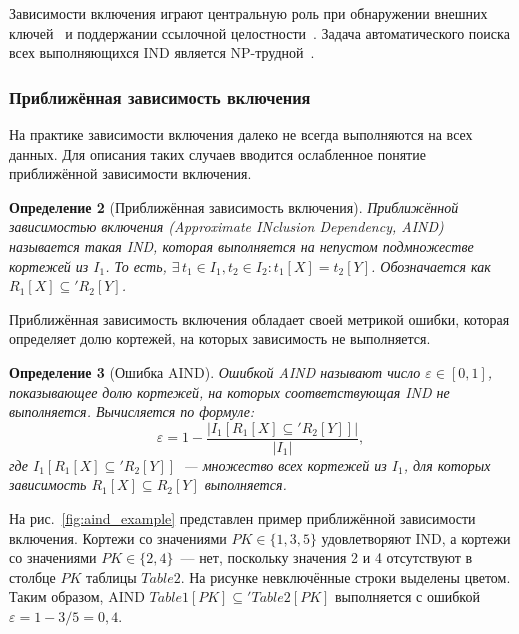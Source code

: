 Зависимости включения играют центральную роль при обнаружении внешних ключей~\cite{rostin2009framework} и поддержании ссылочной целостности~\cite{levene2000justification}. Задача автоматического поиска всех выполняющихся IND является NP-трудной~\cite{kantola1992discovering}.

\subsubsection{Приближённая зависимость включения}

На практике зависимости включения далеко не всегда выполняются на всех данных. Для описания таких случаев вводится ослабленное понятие приближённой зависимости включения.

\textbf{Определение 2} (Приближённая зависимость включения). \emph{Приближённой зависимостью включения (Approximate INclusion Dependency, AIND) называется такая IND, которая выполняется на непустом подмножестве кортежей из $I_1$. То есть, $\exists\, t_1 \in I_1, t_2 \in I_2 : t_1[X] = t_2[Y]$. Обозначается как $R_1[X] \subseteq' R_2[Y]$.}

Приближённая зависимость включения обладает своей метрикой ошибки, которая определяет долю кортежей, на которых зависимость не выполняется.

\textbf{Определение 3} (Ошибка AIND). \emph{Ошибкой AIND называют число $\varepsilon \in [0, 1]$, показывающее долю кортежей, на которых соответствующая IND не выполняется. Вычисляется по формуле:}
\[
\varepsilon = 1 - \frac{|I_1[R_1[X] \subseteq' R_2[Y]]|}{|I_1|},
\]
\emph{где $I_1[R_1[X] \subseteq' R_2[Y]]$~--- множество всех кортежей из $I_1$, для которых зависимость $R_1[X] \subseteq R_2[Y]$ выполняется.}

На рис.~\ref{fig:aind_example} представлен пример приближённой зависимости включения. Кортежи со значениями $\mathit{PK} \in \{1, 3, 5\}$ удовлетворяют IND, а кортежи со значениями $\mathit{PK} \in \{2, 4\}$~--- нет, поскольку значения 2 и 4 отсутствуют в столбце $\mathit{PK}$ таблицы $\mathit{Table2}$. На рисунке невключённые строки выделены цветом. Таким образом, AIND $\mathit{Table1}[\mathit{PK}] \subseteq' \mathit{Table2}[\mathit{PK}]$ выполняется с ошибкой $\varepsilon = 1 - 3/5 = 0{,}4$.

